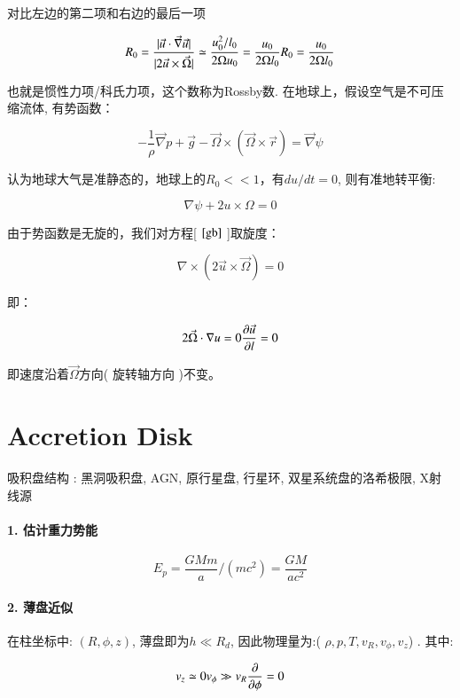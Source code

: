 \documentclass[fontset=windows]{report}
\begin{document}
对比左边的第二项和右边的最后一项

\[R_0=\frac{|\vec{u} \cdot \vec{\nabla} \vec{u}|}{|2 \vec{u} \times \vec{\Omega}|}\simeq\frac{u_0^2/l_0}{2\Omega u_0}=\frac{u_0}{2\Omega l_0}\\
R_0=\frac{u_0}{2\Omega l_0}\]

也就是惯性力项/科氏力项，这个数称为Rossby数.
在地球上，假设空气是不可压缩流体, 有势函数：

\[-\frac{1}{\rho} \vec{\nabla} p+\vec{g}-\vec{\Omega} \times(\vec{\Omega} \times \vec{r})=\vec{\nabla} \psi
\label{4.4shs}\]

认为地球大气是准静态的，地球上的\(R_0<<1\)，有\(du/dt=0\),
则有准地转平衡:

\[\nabla \psi+2u\times\Omega=0 \label{gb}\]

由于势函数是无旋的，我们对方程{[} \(\ref{gb}\) {]}取旋度：

\[\nabla \times (2\vec u\times\vec\Omega)=0\]

即：

\[2\vec\Omega\cdot\nabla u=0\\
\frac{\partial \vec u}{\partial l}=0\]

即速度沿着\(\vec\Omega\)方向( 旋转轴方向 )不变。


\section{Accretion Disk}

吸积盘结构 : 黑洞吸积盘, AGN, 原行星盘, 行星环, 双星系统盘的洛希极限,
X射线源

\hypertarget{1-ux4f30ux8ba1ux91cdux529bux52bfux80fd}{%
\paragraph{1.
估计重力势能}\label{1-ux4f30ux8ba1ux91cdux529bux52bfux80fd}}

\[E_p = \frac{GMm}{a}/(mc^2)=\frac{GM}{ac^2}\]

\hypertarget{2-ux8584ux76d8ux8fd1ux4f3c}{%
\paragraph{2. 薄盘近似}\label{2-ux8584ux76d8ux8fd1ux4f3c}}

在柱坐标中: \((R,\phi,z)\), 薄盘即为\(h \ll R_d \), 因此物理量为:(
\(\rho, p, T, v_R,v_\phi,v_z\)) . 其中:

\[v_z\simeq 0\\
v_{\phi}\gg v_R\\
\frac {\partial}{\partial \phi}=0\]
\end{document}
